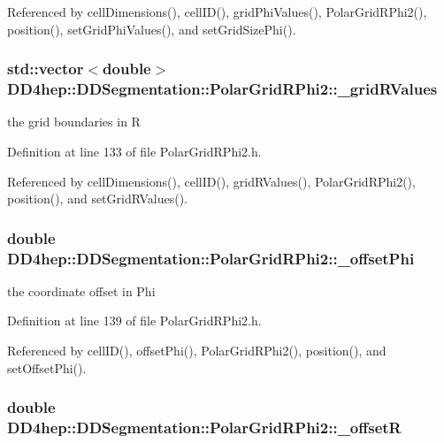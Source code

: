 Referenced by cellDimensions(), cellID(), gridPhiValues(), PolarGridRPhi2(), position(), setGridPhiValues(), and setGridSizePhi().\hypertarget{class_d_d4hep_1_1_d_d_segmentation_1_1_polar_grid_r_phi2_a036c555ece1b698614ed4186f97a72d4}{
\subsubsection[{\_\-gridRValues}]{\setlength{\rightskip}{0pt plus 5cm}std::vector$<$double$>$ {\bf DD4hep::DDSegmentation::PolarGridRPhi2::\_\-gridRValues}}}
\label{class_d_d4hep_1_1_d_d_segmentation_1_1_polar_grid_r_phi2_a036c555ece1b698614ed4186f97a72d4}


the grid boundaries in R 

Definition at line 133 of file PolarGridRPhi2.h.

Referenced by cellDimensions(), cellID(), gridRValues(), PolarGridRPhi2(), position(), and setGridRValues().\hypertarget{class_d_d4hep_1_1_d_d_segmentation_1_1_polar_grid_r_phi2_aab823b5b9e861ba2db50721d800d451a}{
\subsubsection[{\_\-offsetPhi}]{\setlength{\rightskip}{0pt plus 5cm}double {\bf DD4hep::DDSegmentation::PolarGridRPhi2::\_\-offsetPhi}}}
\label{class_d_d4hep_1_1_d_d_segmentation_1_1_polar_grid_r_phi2_aab823b5b9e861ba2db50721d800d451a}


the coordinate offset in Phi 

Definition at line 139 of file PolarGridRPhi2.h.

Referenced by cellID(), offsetPhi(), PolarGridRPhi2(), position(), and setOffsetPhi().\hypertarget{class_d_d4hep_1_1_d_d_segmentation_1_1_polar_grid_r_phi2_a775bd660c36c5310b65195f3080e92fe}{
\subsubsection[{\_\-offsetR}]{\setlength{\rightskip}{0pt plus 5cm}double {\bf DD4hep::DDSegmentation::PolarGridRPhi2::\_\-offsetR}}}
\label{class_d_d4hep_1_1_d_d_segmentation_1_1_polar_grid_r_phi2_a775bd660c36c5310b65195f3080e92fe}


